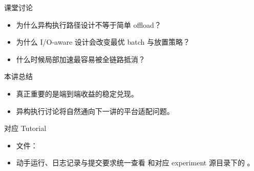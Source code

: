 

\begin{frame}{课堂讨论}
  \begin{itemize}
    \item 为什么异构执行路径设计不等于简单 offload？
    \item 为什么 I/O-aware 设计会改变最优 batch 与放置策略？
    \item 什么时候局部加速最容易被全链路抵消？
  \end{itemize}
\end{frame}

\begin{frame}{本讲总结}
  \begin{itemize}
    \item 真正重要的是端到端收益的稳定兑现。
    \item 异构执行讨论将自然通向下一讲的平台适配问题。
  \end{itemize}
\end{frame}

\LectureEightSources

\begin{frame}{对应 Tutorial}
  \begin{itemize}
    \item 文件：\texttt{}
    \item 动手运行、日志记录与提交要求统一查看 \texttt{} 和对应 experiment 源目录下的 \texttt{}。
  \end{itemize}
\end{frame}


